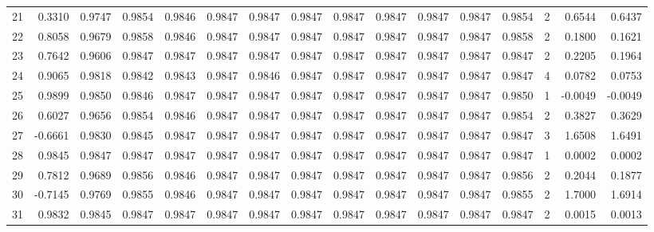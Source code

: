 \begin{tabular}{lrrrrrrrrrrrrrrr}
21  &      0.3310 &  0.9747 &  0.9854 &  0.9846 &  0.9847 &  0.9847 &  0.9847 &  0.9847 &  0.9847 &  0.9847 &   0.9847 &     0.9854 &      2 &                    0.6544 &                     0.6437 \\
22  &      0.8058 &  0.9679 &  0.9858 &  0.9846 &  0.9847 &  0.9847 &  0.9847 &  0.9847 &  0.9847 &  0.9847 &   0.9847 &     0.9858 &      2 &                    0.1800 &                     0.1621 \\
23  &      0.7642 &  0.9606 &  0.9847 &  0.9847 &  0.9847 &  0.9847 &  0.9847 &  0.9847 &  0.9847 &  0.9847 &   0.9847 &     0.9847 &      2 &                    0.2205 &                     0.1964 \\
24  &      0.9065 &  0.9818 &  0.9842 &  0.9843 &  0.9847 &  0.9846 &  0.9847 &  0.9847 &  0.9847 &  0.9847 &   0.9847 &     0.9847 &      4 &                    0.0782 &                     0.0753 \\
25  &      0.9899 &  0.9850 &  0.9846 &  0.9847 &  0.9847 &  0.9847 &  0.9847 &  0.9847 &  0.9847 &  0.9847 &   0.9847 &     0.9850 &      1 &                   -0.0049 &                    -0.0049 \\
26  &      0.6027 &  0.9656 &  0.9854 &  0.9846 &  0.9847 &  0.9847 &  0.9847 &  0.9847 &  0.9847 &  0.9847 &   0.9847 &     0.9854 &      2 &                    0.3827 &                     0.3629 \\
27  &     -0.6661 &  0.9830 &  0.9845 &  0.9847 &  0.9847 &  0.9847 &  0.9847 &  0.9847 &  0.9847 &  0.9847 &   0.9847 &     0.9847 &      3 &                    1.6508 &                     1.6491 \\
28  &      0.9845 &  0.9847 &  0.9847 &  0.9847 &  0.9847 &  0.9847 &  0.9847 &  0.9847 &  0.9847 &  0.9847 &   0.9847 &     0.9847 &      1 &                    0.0002 &                     0.0002 \\
29  &      0.7812 &  0.9689 &  0.9856 &  0.9846 &  0.9847 &  0.9847 &  0.9847 &  0.9847 &  0.9847 &  0.9847 &   0.9847 &     0.9856 &      2 &                    0.2044 &                     0.1877 \\
30  &     -0.7145 &  0.9769 &  0.9855 &  0.9846 &  0.9847 &  0.9847 &  0.9847 &  0.9847 &  0.9847 &  0.9847 &   0.9847 &     0.9855 &      2 &                    1.7000 &                     1.6914 \\
31  &      0.9832 &  0.9845 &  0.9847 &  0.9847 &  0.9847 &  0.9847 &  0.9847 &  0.9847 &  0.9847 &  0.9847 &   0.9847 &     0.9847 &      2 &                    0.0015 &                     0.0013 \\

\end{tabular}
